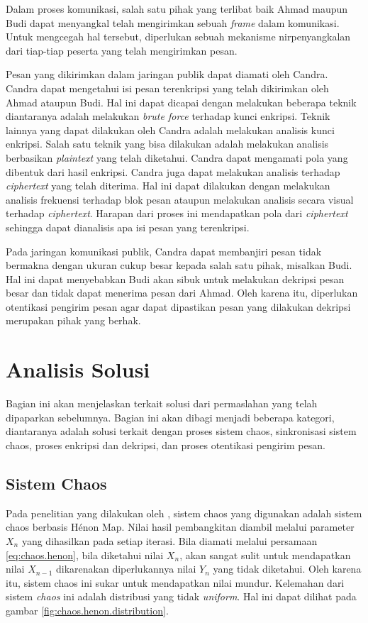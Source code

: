 Dalam proses komunikasi, salah satu pihak yang terlibat baik Ahmad maupun Budi dapat menyangkal telah mengirimkan sebuah \emph{frame} dalam komunikasi. Untuk mengcegah hal tersebut, diperlukan sebuah mekanisme nirpenyangkalan dari tiap-tiap peserta yang telah mengirimkan pesan.

Pesan yang dikirimkan dalam jaringan publik dapat diamati oleh Candra. Candra dapat mengetahui isi pesan terenkripsi yang telah dikirimkan oleh Ahmad ataupun Budi. Hal ini dapat dicapai dengan melakukan beberapa teknik diantaranya adalah melakukan \emph{brute force} terhadap kunci enkripsi. Teknik lainnya yang dapat dilakukan oleh Candra adalah melakukan analisis kunci enkripsi. Salah satu teknik yang bisa dilakukan adalah melakukan analisis berbasikan \emph{plaintext} yang telah diketahui. Candra dapat mengamati pola yang dibentuk dari hasil enkripsi. Candra juga dapat melakukan analisis terhadap \emph{ciphertext} yang telah diterima. Hal ini dapat dilakukan dengan melakukan analisis frekuensi terhadap blok pesan ataupun melakukan analisis secara visual terhadap \emph{ciphertext}. Harapan dari proses ini mendapatkan pola dari \emph{ciphertext} sehingga dapat dianalisis apa isi pesan yang terenkripsi.

Pada jaringan komunikasi publik, Candra dapat membanjiri pesan tidak bermakna dengan ukuran cukup besar kepada salah satu pihak, misalkan Budi. Hal ini dapat menyebabkan Budi akan sibuk untuk melakukan dekripsi pesan besar dan tidak dapat menerima pesan dari Ahmad. Oleh karena itu, diperlukan otentikasi pengirim pesan agar dapat dipastikan pesan yang dilakukan dekripsi merupakan pihak yang berhak.

\section{Analisis Solusi}

Bagian ini akan menjelaskan terkait solusi dari permaslahan yang telah dipaparkan sebelumnya. Bagian ini akan dibagi menjadi beberapa kategori, diantaranya adalah solusi terkait dengan proses sistem chaos, sinkronisasi sistem chaos, proses enkripsi dan dekripsi, dan proses otentikasi pengirim pesan.

\subsection{Sistem Chaos}

Pada penelitian yang dilakukan oleh \textcite{lin2021}, sistem chaos yang digunakan adalah sistem chaos berbasis Hénon Map. Nilai hasil pembangkitan diambil melalui parameter $X_n$ yang dihasilkan pada setiap iterasi. Bila diamati melalui persamaan \ref{eq:chaos.henon}, bila diketahui nilai $X_n$, akan sangat sulit untuk mendapatkan nilai $X_{n-1}$ dikarenakan diperlukannya nilai $Y_n$ yang tidak diketahui. Oleh karena itu, sistem chaos ini sukar untuk mendapatkan nilai mundur. Kelemahan dari sistem \emph{chaos} ini adalah distribusi yang tidak \emph{uniform}. Hal ini dapat dilihat pada gambar \ref{fig:chaos.henon.distribution}.

